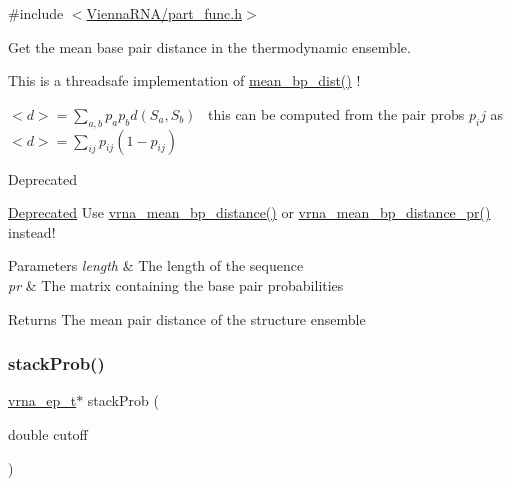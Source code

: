 {\ttfamily \#include $<$\mbox{\hyperlink{part__func_8h}{Vienna\+R\+N\+A/part\+\_\+func.\+h}}$>$}



Get the mean base pair distance in the thermodynamic ensemble. 

This is a threadsafe implementation of \mbox{\hyperlink{part__func_8h_ae9556ba7ded44fe2321b6f67c3fc02a3}{mean\+\_\+bp\+\_\+dist()}} !

$<d> = \sum_{a,b} p_a p_b d(S_a,S_b)$~\newline
this can be computed from the pair probs $p_ij$ as~\newline
 $<d> = \sum_{ij} p_{ij}(1-p_{ij})$

\begin{DoxyRefDesc}{Deprecated}
\item[\mbox{\hyperlink{deprecated__deprecated000104}{Deprecated}}]Use \mbox{\hyperlink{group__part__func__global_gaa6b8983b559b9ef4b2e1b31113ea317b}{vrna\+\_\+mean\+\_\+bp\+\_\+distance()}} or \mbox{\hyperlink{group__part__func__global_gad3f0c240512e6d43e2e4d4c2076021f5}{vrna\+\_\+mean\+\_\+bp\+\_\+distance\+\_\+pr()}} instead!\end{DoxyRefDesc}



\begin{DoxyParams}{Parameters}
{\em length} & The length of the sequence \\
\hline
{\em pr} & The matrix containing the base pair probabilities \\
\hline
\end{DoxyParams}
\begin{DoxyReturn}{Returns}
The mean pair distance of the structure ensemble 
\end{DoxyReturn}
\mbox{\label{group__part__func__global__deprecated_ga8f18624bcd0b47d1a266d9e5527e5362}} 
\subsubsection{\texorpdfstring{stackProb()}{stackProb()}}
{\footnotesize\ttfamily \mbox{\hyperlink{group__struct__utils__plist_gab9ac98ab55ded9fb90043b024b915aca}{vrna\+\_\+ep\+\_\+t}}$\ast$ stack\+Prob (\begin{DoxyParamCaption}\item[{double}]{cutoff }\end{DoxyParamCaption})}



